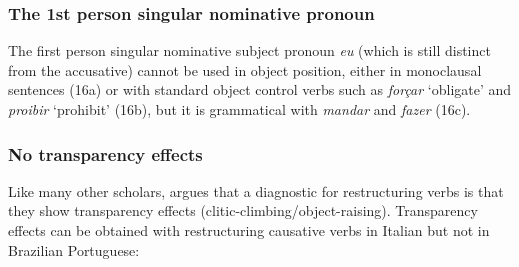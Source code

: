 \documentclass[output=paper]{langsci/langscibook}
\begin{document}
\subsubsection{The 1st person singular nominative pronoun}%

The first person singular nominative subject pronoun \textit{eu} (which is still distinct from the accusative) cannot be used in object position, either in monoclausal sentences (16a) or with standard object control verbs such as \textit{forçar} ‘obligate’ and \textit{proibir} ‘prohibit’ (16b), but it is grammatical with \textit{mandar} and \textit{fazer} (16c). 

\ea%
    \label{ex:moreno:16}
    \z
\z

\subsubsection{No transparency effects}%

Like many other scholars, \citet{Cinque2004} argues that a diagnostic for restructuring verbs is that they show transparency effects (clitic-climbing\slash object-raising). Transparency effects can be obtained with restructuring causative verbs in Italian but not in Brazilian Portuguese:

\ea%
    \label{ex:moreno:17}
    \z
\z
\end{document}
